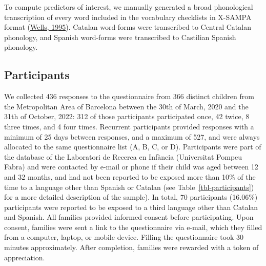 \documentclass[
]{article}
\begin{document}
To compute predictors of interest, we manually generated a broad
phonological transcription of every word included in the vocabulary
checklists in X-SAMPA format
(\protect\hyperlink{ref-wells1995computercoding}{Wells, 1995}). Catalan
word-forms were transcribed to Central Catalan phonology, and Spanish
word-forms were transcribed to Castilian Spanish phonology.

\hypertarget{sec-participants}{%
\subsection{Participants}\label{sec-participants}}

We collected 436 responses to the questionnaire from 366 distinct
children from the Metropolitan Area of Barcelona between the 30th of
March, 2020 and the 31th of October, 2022: 312 of those participants
participated once, 42 twice, 8 three times, and 4 four times. Recurrent
participants provided responses with a minimum of 25 days between
responses, and a maximum of 527, and were always allocated to the same
questionnaire list (A, B, C, or D). Participants were part of the
database of the Laboratori de Recerca en Infància (Universitat Pompeu
Fabra) and were contacted by e-mail or phone if their child was aged
between 12 and 32 months, and had not been reported to be exposed more
than 10\% of the time to a language other than Spanish or Catalan (see
Table~\ref{tbl-participants}) for a more detailed description of the
sample). In total, 70 participants (16.06\%) participants were reported
to be exposed to a third language other than Catalan and Spanish. All
families provided informed consent before participating. Upon consent,
families were sent a link to the questionnaire via e-mail, which they
filled from a computer, laptop, or mobile device. Filling the
questionnaire took 30 minutes approximately. After completion, families
were rewarded with a token of appreciation.
\end{document}
